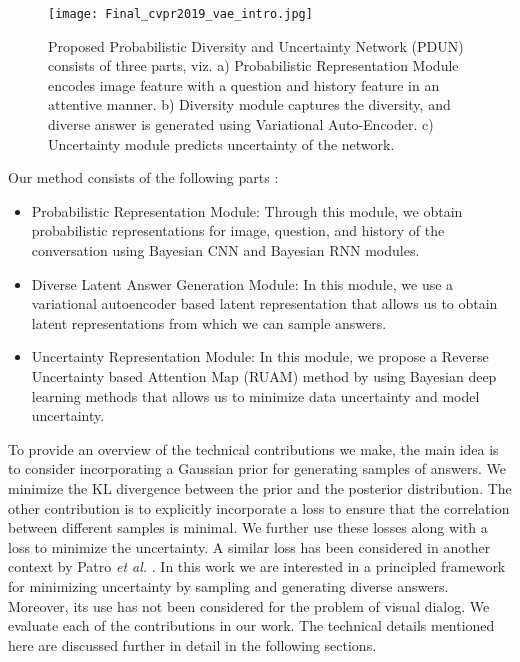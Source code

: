 \documentclass[review]{elsarticle}
\begin{document}
\begin{figure*}[!htb]
	\centering
	\texttt{[image: Final\_cvpr2019\_vae\_intro.jpg]}
	\vspace{-3em}
	\caption{Proposed Probabilistic Diversity and Uncertainty Network (PDUN) consists of three parts, viz. a) Probabilistic Representation Module encodes image feature with a question and history feature in an attentive manner. b) Diversity module captures the diversity, and diverse answer is generated using Variational Auto-Encoder. c) Uncertainty module predicts uncertainty of the network.}
	\label{fig:intro}
\end{figure*}
Our method consists of the following parts :
\begin{itemize}
	\item Probabilistic Representation Module: Through this module, we obtain probabilistic representations for image, question, and history of the conversation using Bayesian CNN and Bayesian RNN modules. 
	\item Diverse Latent Answer Generation Module: In this module, we use a variational autoencoder based latent representation that allows us to obtain latent representations from which we can sample answers.
	\item Uncertainty Representation Module:  In this module, we propose a Reverse Uncertainty based Attention Map (RUAM) method by using Bayesian deep learning methods that allows us to minimize data uncertainty and model uncertainty. 
\end{itemize}


To provide an overview of the technical contributions we make, the main idea is to consider incorporating a Gaussian prior for generating samples of answers. We minimize the KL divergence between the prior and the posterior distribution. The other contribution is to explicitly incorporate a loss to ensure that the correlation between different samples is minimal. We further use these losses along with a loss to minimize the uncertainty. A similar loss has been considered in another context by Patro {\it et al.} \cite{Patro_ICCV2019}. In this work we are interested in a principled framework for minimizing uncertainty by sampling and generating diverse answers. Moreover, its use has not been considered for the problem of visual dialog. We evaluate each of the contributions in our work. The technical details mentioned here are discussed further in detail in the following sections.
\end{document}
